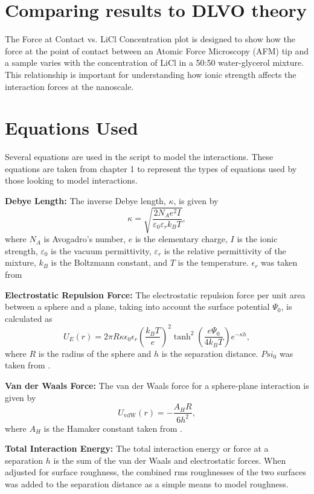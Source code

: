 \section{Comparing results to DLVO theory}


The Force at Contact vs. LiCl Concentration plot is designed to show how the force at the point of contact between an Atomic Force Microscopy (AFM) tip and a sample varies with the concentration of LiCl in a 50:50 water-glycerol mixture. This relationship is important for understanding how ionic strength affects the interaction forces at the nanoscale.

\section*{Equations Used}

Several equations are used in the script to model the interactions. These equations are taken from chapter 1 to represent the types of equations used by those looking to model interactions. 

\textbf{Debye Length:} The inverse Debye length, $\kappa$, is given by
    \[
    \kappa = \sqrt{\frac{2 N_A e^2 I}{\varepsilon_0 \varepsilon_r k_B T}},
    \]
    where $N_A$ is Avogadro's number, $e$ is the elementary charge, $I$ is the ionic strength, $\varepsilon_0$ is the vacuum permittivity, $\varepsilon_r$ is the relative permittivity of the mixture, $k_B$ is the Boltzmann constant, and $T$ is the temperature. $\epsilon_r$ was taken from \cite{behrends2006dielectric}
    
\textbf{Electrostatic Repulsion Force:} The electrostatic repulsion force per unit area between a sphere and a plane, taking into account the surface potential $\Psi_0$, is calculated as
    \[
    U_E(r) = 2 \pi R \kappa \epsilon_0 \epsilon_r \left( \frac{k_B T}{e} \right)^2 \tanh^2\left(\frac{e \Psi_0}{4 k_B T}\right) e^{-\kappa h},
    \]
    where $R$ is the radius of the sphere and $h$ is the separation distance. $Psi_0$ was taken from \cite{silica2021}.
    
\textbf{Van der Waals Force:} The van der Waals force for a sphere-plane interaction is given by
    \[
    U_{\text{vdW}}(r) = -\frac{A_H R}{6 h^2},
    \]
    where $A_H$ is the Hamaker constant taken from \cite{Bergstrom1997}.
    
\textbf{Total Interaction Energy:} The total interaction energy or force at a separation $h$ is the sum of the van der Waals and electrostatic forces. When adjusted for surface roughness, the combined rms roughnesses of the two surfaces was added to the separation distance as a simple means to model roughness.


